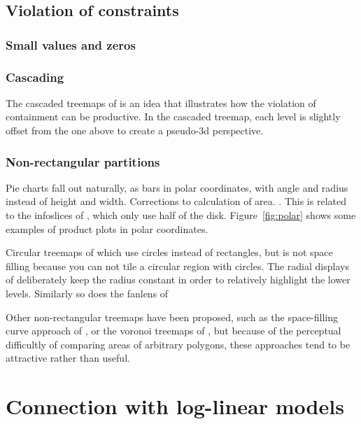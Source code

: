 \documentclass[letterpaper,oneside]{scrartcl}
\begin{document}
\subsection{Violation of constraints}

\subsubsection{Small values and zeros}
\subsubsection{Cascading}

The cascaded treemaps of \citet{lu:2008} is an idea that illustrates how the violation of containment can be productive.  In the cascaded treemap, each level is slightly offset from the one above to create a pseudo-3d perspective.

\subsubsection{Non-rectangular partitions}

Pie charts fall out naturally, as bars in polar coordinates, with angle and radius instead of height and width. Corrections to calculation of area.  .  This is related to the infoslices of \citet{andrews:1998}, which only use half of the disk.  Figure~\ref{fig:polar} shows some examples of product plots in polar coordinates.

Circular treemaps of \citet{wetzel:2008} which use circles instead of rectangles, but is not space filling because you can not tile a circular region with circles. The radial displays of \citet{stasko:2000} deliberately keep the radius constant in order to relatively highlight the lower levels.  Similarly so does the fanlens of \citet{lou:2007}

Other non-rectangular treemaps have been proposed, such as the space-filling curve approach of \citep{wattenberg:2005}, or the voronoi treemaps of \citep{wattenberg:2005}, but because of the perceptual difficultly of comparing areas of arbitrary polygons, these approaches tend to be attractive rather than useful.


\section{Connection with log-linear models}
\label{sec:models}
\end{document}
